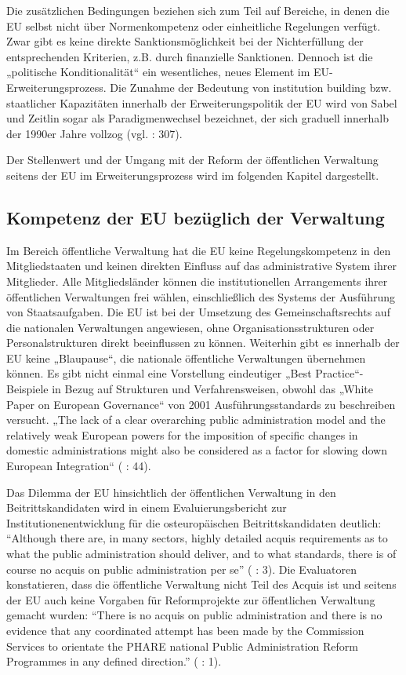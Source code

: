 Die zusätzlichen Bedingungen beziehen sich zum Teil auf Bereiche, in denen die EU selbst nicht über Normenkompetenz oder einheitliche Regelungen verfügt. Zwar gibt es keine direkte Sanktionsmöglichkeit bei der Nichterfüllung der entsprechenden Kriterien, z.B. durch finanzielle Sanktionen. Dennoch ist die „politische Konditionalität“ ein wesentliches, neues Element im EU-Erweiterungsprozess. Die Zunahme der Bedeutung von institution building bzw. staatlicher Kapazitäten innerhalb der Erweiterungspolitik der EU wird von Sabel und Zeitlin sogar als Paradigmenwechsel bezeichnet, der sich graduell innerhalb der 1990er Jahre vollzog (vgl. \cite{sabzei} : 307).\par
Der Stellenwert und der Umgang mit der Reform der öffentlichen Verwaltung seitens der EU im Erweiterungsprozess wird im folgenden Kapitel dargestellt.

\subsection{Kompetenz der EU bezüglich der Verwaltung}
\label{subsec:Kompetenz der EU}
Im Bereich öffentliche Verwaltung hat die EU keine Regelungskompetenz in den Mitgliedstaaten und keinen direkten Einfluss auf das administrative System ihrer Mitglieder. Alle Mitgliedsländer können die institutionellen Arrangements ihrer öffentlichen Verwaltungen frei wählen, einschließlich des Systems der Ausführung von Staatsaufgaben. Die EU ist bei der Umsetzung des Gemeinschaftsrechts auf die nationalen Verwaltungen angewiesen, ohne Organisationsstrukturen oder Personalstrukturen direkt beeinflussen zu können. Weiterhin gibt es innerhalb der EU keine „Blaupause“, die nationale öffentliche Verwaltungen übernehmen können. Es gibt nicht einmal eine Vorstellung eindeutiger „Best Practice“-Beispiele in Bezug auf Strukturen und Verfahrensweisen, obwohl das „White Paper on European Governance“ von 2001 Ausführungsstandards zu beschreiben versucht. „The lack of a clear overarching public administration model and the relatively weak European powers for the imposition of specific changes in domestic administrations might also be considered as a factor for slowing down European Integration“ (\cite{sverdrup} : 44).\par

Das Dilemma der EU hinsichtlich der öffentlichen Verwaltung in den Beitrittskandidaten wird in einem Evaluierungsbericht zur Institutionenentwicklung für die osteuropäischen Beitrittskandidaten deutlich: “Although there are, in many sectors, highly detailed acquis requirements as to what the public administration should deliver, and to what standards, there is of course no acquis on public administration per se” (\cite{omas} : 3). Die Evaluatoren konstatieren, dass die öffentliche Verwaltung nicht Teil des Acquis ist und seitens der EU auch keine Vorgaben für Reformprojekte zur öffentlichen Verwaltung gemacht wurden: “There is no acquis on public administration and there is no evidence that any coordinated attempt has been made by the Commission Services to orientate the PHARE national Public Administration Reform Programmes in any defined direction.” (\cite{omas} : 1). \par

